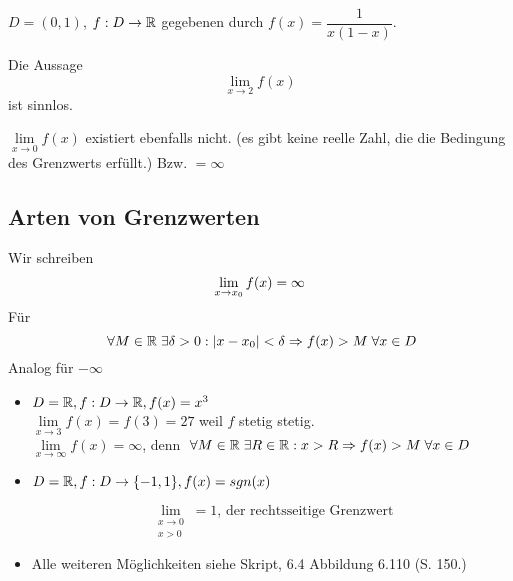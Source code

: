 \documentclass[main.tex]{subfiles}
\begin{document}
\begin{Beispiel}
  $D=(0,1)$, $f:D\to \mathbb{R}$ gegebenen durch $f(x) = \dfrac{1}{x(1-x)}$.

  Die Aussage $$\lim \limits_{x\to 2} f(x)$$ ist sinnlos.

  $\lim \limits_{x \to 0} f(x)$ existiert ebenfalls nicht. (es gibt keine reelle Zahl, die die Bedingung des Grenzwerts erfüllt.) Bzw. $ = \infty$
\end{Beispiel}

\subsection{Arten von Grenzwerten}

\begin{Definition}
  Wir schreiben
  $$\lim \limits_{x \to x_0} f(x) = \infty$$
  Für
  $$\;\forall M \in \mathbb{R} \;\exists \delta > 0 : |x-x_0| < \delta \Rightarrow f(x)> M \;\forall x \in D$$
  Analog für $- \infty$
\end{Definition}

\begin{Beispiel}
  \begin{itemize}
    \item $D = \mathbb{R}, f: D \to \mathbb{R}, f(x) = x^3$\\
      $\lim \limits_{x \to 3} f(x) = f(3) = 27$ weil $f$ stetig stetig.\\
      $\lim \limits_{x \to \infty} f(x) = \infty$, denn $\;\forall M \in \mathbb{R} \;\exists R \in \mathbb{R} : x > R \Rightarrow f(x) > M \;\forall x \in D$
    \item $D = \mathbb{R}, f: D \to \{-1,1\}, f(x) = sgn(x)$
      \begin{center}
      \end{center}
      $$\lim \limits_{\substack{x \to 0 \\ x > 0}} = 1 \text{, der rechtsseitige Grenzwert}$$
    \item Alle weiteren Möglichkeiten siehe Skript, 6.4 Abbildung 6.110 (S. 150.)
  \end{itemize}
\end{Beispiel}
\end{document}
